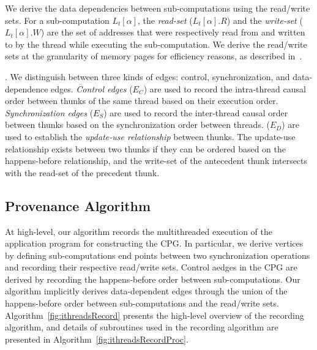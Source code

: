  We derive the data dependencies between sub-computations using the read/write sets. For a sub-computation $L_t[\alpha]$, the {\em read-set}
($L_t[\alpha].R$) and the {\em write-set} ($L_t[\alpha].W$) are the set of
addresses that were respectively read from and written to by
the thread while executing the sub-computation. We derive the read/write sets at the granularity of memory pages for efficiency reasons, as described in~.

.
We distinguish between three kinds of edges: control, synchronization, and data-dependence edges.
{\em Control edges} ($E_{C}$) are used to record the intra-thread causal order between thunks of the same thread
based on their execution order. {\em Synchronization edges}  ($E_{S}$) are
used to record the inter-thread causal order between thunks based on the synchronization order between threads. ($E_{D}$) are used to establish the {\em update-use relationship} between thunks. The update-use relationship exists between two thunks if they can be  ordered based on the happens-before relationship, and the write-set of the  antecedent thunk intersects with the read-set of the precedent thunk.



 
 
 \subsection{ Provenance Algorithm}

 
 
At high-level, our algorithm records the multithreaded execution of the
application program for constructing the CPG.
In particular, we derive vertices  by defining
sub-computations end points between two synchronization operations and recording their respective read/write sets. Control aedges in the CPG are derived by recording the happens-before order between sub-computations. Our algorithm implicitly derives data-dependent edges through the union of the happens-before order between sub-computations and the read/write sets. Algorithm~\ref{fig:ithreadsRecord} presents the high-level
overview of the recording algorithm, and details of subroutines used in the recording algorithm are presented in Algorithm~\ref{fig:ithreadsRecordProc}.
  

